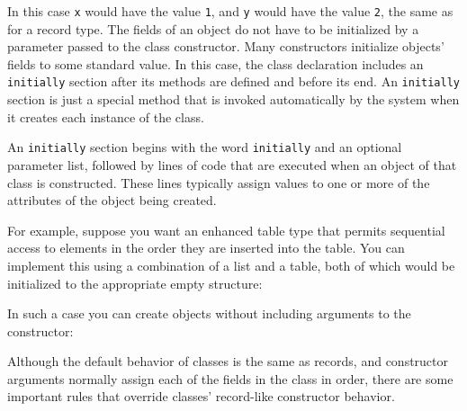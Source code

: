 In this case \texttt{x} would have the value \texttt{1}, and \texttt{y}
would have the value \texttt{2}, the same as for a record
type. The fields of an object do not have to be initialized by a
parameter passed to the class constructor. Many constructors initialize
objects' fields to some standard value. In this case,
the class declaration includes an \texttt{initially}
section after its methods are defined and before its end. An
\texttt{initially} section is just a special method that is invoked
automatically by the system when it creates each instance of the class.

An \texttt{initially} section begins with the word \texttt{initially}
and an optional parameter list, followed by lines of code that are
executed when an object of that class is constructed.  These lines
typically assign values to one or more of the attributes of the object
being created.

For example, suppose you want an enhanced table type that permits
sequential access to elements in the order they are inserted into the
table. You can implement this using a combination of a list and a
table, both of which would be initialized to the appropriate empty
structure:


\noindent
In such a case you can create objects without including arguments to the
constructor:


Although the default behavior of classes is the same as records, and
constructor arguments normally assign each of the fields in the class
in order, there are some important rules that override classes'
record-like constructor behavior.

